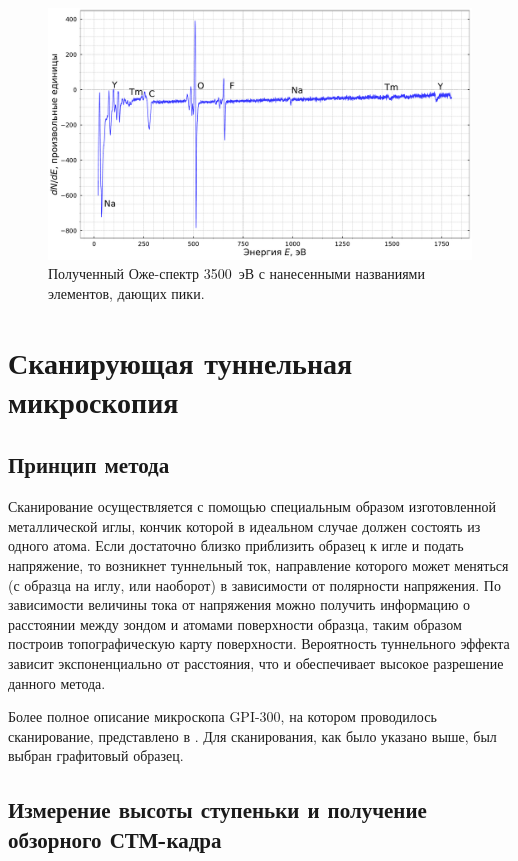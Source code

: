 \documentclass[a4paper, 12pt]{article}
\begin{document}
\begin{figure}[H]
	\centering
	\includegraphics[width=0.9\linewidth]{1_Auge_3500}
	\caption{Полученный Оже-спектр 3500~эВ с нанесенными названиями элементов, дающих пики.}
	\label{fig:1_Auge_3500}
\end{figure}

\section{Сканирующая туннельная микроскопия}

\subsection{Принцип метода}

Сканирование осуществляется с помощью специальным образом изготовленной металлической иглы, кончик которой в идеальном случае должен состоять из одного атома. Если достаточно близко приблизить образец к игле и подать напряжение, то возникнет туннельный ток, направление которого может меняться (с образца на иглу, или наоборот) в зависимости от полярности напряжения. По зависимости величины тока от напряжения можно получить информацию о расстоянии между зондом и атомами поверхности образца, таким образом построив топографическую карту поверхности. Вероятность туннельного эффекта зависит экспоненциально от расстояния, что и обеспечивает высокое разрешение данного метода.

Более полное описание микроскопа GPI-300, на котором проводилось сканирование, представлено в \cite{Eltsov}. Для сканирования, как было указано выше, был выбран графитовый образец.

\subsection{Измерение высоты ступеньки и получение обзорного СТМ-кадра}
\end{document}
